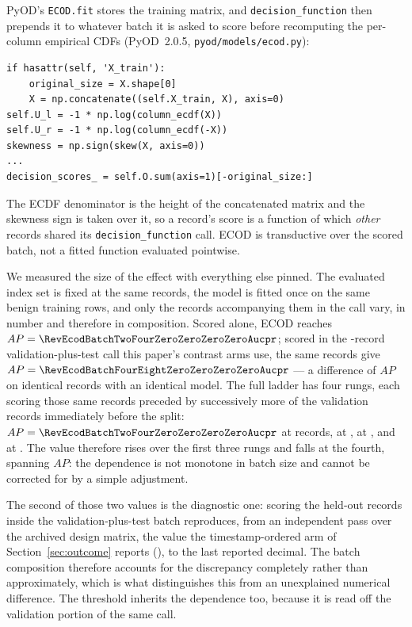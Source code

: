 \documentclass[manuscript,screen,nonacm]{acmart}
\begin{document}
\noindent\begin{minipage}{\linewidth}
PyOD's \texttt{ECOD.fit} stores the training matrix, and
\texttt{decision\_function} then prepends it to whatever batch it is asked to
score before recomputing the per-column empirical CDFs
(PyOD~2.0.5, \texttt{pyod/models/ecod.py}):
\begin{verbatim}
if hasattr(self, 'X_train'):
    original_size = X.shape[0]
    X = np.concatenate((self.X_train, X), axis=0)
self.U_l = -1 * np.log(column_ecdf(X))
self.U_r = -1 * np.log(column_ecdf(-X))
skewness = np.sign(skew(X, axis=0))
...
decision_scores_ = self.O.sum(axis=1)[-original_size:]
\end{verbatim}
\end{minipage}\par\medskip

The ECDF denominator is the height of the concatenated matrix and the skewness
sign is taken over it, so a record's score is a function of which \emph{other}
records shared its \texttt{decision\_function} call. ECOD is transductive over
the scored batch, not a fitted function evaluated pointwise.

We measured the size of the effect with everything else pinned. The evaluated
index set is fixed at the same \RevEcodBatchEvalRecords{} records, the model is
fitted once on the same benign training rows, and only the records
accompanying them in the call vary, in number and therefore in composition. Scored alone, ECOD reaches
$AP=\RevEcodBatchTwoFourZeroZeroZeroZeroAucpr$; scored in the
\CicidsEcodScoringBatch-record validation-plus-test call this paper's contrast
arms use, the same records give
$AP=\RevEcodBatchFourEightZeroZeroZeroZeroAucpr$ --- a difference of
\RevEcodBatchDelta{} $AP$ on identical records with an identical model. The
full ladder has four rungs, each scoring those same
\RevEcodBatchEvalRecords{} records preceded by successively more of the
validation records immediately before the split:
$AP=\RevEcodBatchTwoFourZeroZeroZeroZeroAucpr$ at
\RevEcodBatchEvalRecords{} records,
\RevEcodBatchThreeZeroZeroZeroZeroZeroAucpr{} at \RevEcodBatchLadderOne,
\RevEcodBatchThreeSixZeroZeroZeroZeroAucpr{} at \RevEcodBatchLadderTwo, and
\RevEcodBatchFourEightZeroZeroZeroZeroAucpr{} at \CicidsEcodScoringBatch. The
value therefore rises over the first three rungs and falls at the fourth,
spanning \RevEcodBatchSpread{} $AP$: the dependence is not monotone in batch
size and cannot be corrected for by a simple adjustment.

The second of those two values is the diagnostic one: scoring the held-out
records inside the validation-plus-test batch reproduces, from an independent
pass over the archived design matrix, the value the timestamp-ordered arm of
Section~\ref{sec:outcome} reports (\SFourCicidsNaturalEcodAucpr), to the last
reported decimal. The batch composition therefore accounts for the discrepancy
completely rather than approximately, which is what distinguishes this from an
unexplained numerical difference. The threshold inherits the dependence too, because it is read off
the validation portion of the same call.
\end{document}
